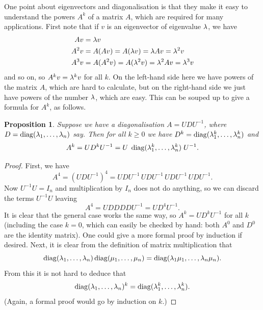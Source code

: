 \documentclass[reqno]{amsart}
\newtheorem{proposition}[theorem]{Proposition}
\theoremstyle{definition}
\begin{document}
One point about eigenvectors and diagonalisation is that they make it
easy to understand the powers $A^k$ of a matrix $A$, which are
required for many applications.  First note that if $v$ is an
eigenvector of eigenvalue $\lambda$, we have
\begin{align*}
 Av &= \lambda v \\
 A^2v &= A(Av)= A(\lambda v) = \lambda Av = \lambda^2v \\
 A^3v &= A(A^2v) = A(\lambda^2 v) = \lambda^2Av = \lambda^3 v 
\end{align*}
and so on, so $A^kv=\lambda^kv$ for all $k$.  On the left-hand side here
we have powers of the matrix $A$, which are hard to calculate, but on
the right-hand side we just have powers of the number $\lambda$, which are
easy.  This can be souped up to give a formula for $A^k$, as follows.

\begin{proposition}\label{prop-diag-powers}
 Suppose we have a diagonalisation $A=UDU^{-1}$, where
 $D=\operatorname{diag}(\lambda_1,\dotsc,\lambda_n)$ say.  Then for all $k\geq 0$ we have 
 $D^k=\operatorname{diag}(\lambda_1^k,\dotsc,\lambda_n^k)$ and 
 \[ A^k = UD^kU^{-1} = U\;\operatorname{diag}(\lambda_1^k,\dotsc,\lambda_n^k)\;U^{-1}. \]
\end{proposition}
\begin{proof}
 First, we have 
 \[ A^4 = (UDU^{-1})^4 = 
    UDU^{-1}\,UDU^{-1}\,UDU^{-1}\,UDU^{-1}.
 \]
 Now $U^{-1}U=I_n$ and multiplication by $I_n$ does not do anything,
 so we can discard the terms $U^{-1}U$ leaving
 \[ A^4 = UDDDDU^{-1} = UD^4 U^{-1}. \]
 It is clear that the general case works the same way, so
 $A^k=UD^kU^{-1}$ for all $k$
 (including the case $k=0$, which can easily be checked by hand:
 both $A^0$ and $D^0$ are the identity matrix).
 One could give a more formal proof by
 induction if desired.  Next, it is clear from the definition of
 matrix multiplication that
 \[ \operatorname{diag}(\lambda_1,\dotsc,\lambda_n)\operatorname{diag}(\mu_1,\dotsc,\mu_n) =
     \operatorname{diag}(\lambda_1\mu_1,\dotsc,\lambda_n\mu_n).
 \]
 From this it is not hard to deduce that 
 \[ \operatorname{diag}(\lambda_1,\dotsc,\lambda_n)^k = \operatorname{diag}(\lambda_1^k,\dotsc,\lambda_n^k). \]
 (Again, a formal proof would go by induction on $k$.)
\end{proof}
\end{document}
